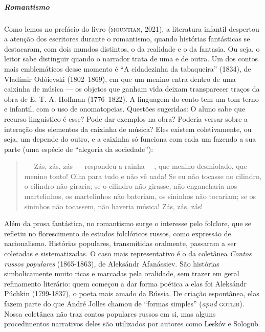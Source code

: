 \documentclass[11pt]{extarticle}
\begin{document}
\subparagraph{Romantismo}
Como lemos no prefácio do livro (\textsc{mountian}, 2021), a literatura
infantil despertou a atenção dos escritores durante o romantismo, quando
histórias fantásticas se destacaram, com dois mundos distintos, o da
realidade e o da fantasia. Ou seja, o leitor sabe distinguir quando o
narrador trata de uma e de outra. Um dos contos mais emblemáticos desse
momento é ``A cidadezinha da tabaqueira'' (1834), de Vladímir Odóievski
(1802--1869), em que um menino entra dentro de uma caixinha de música
--- os objetos que ganham vida deixam transparecer traços da obra de E.
T. A. Hoffman (1776--1822). A linguagem do conto tem um tom terno e
infantil, com o uso de onomatopeias. Questões sugeridas: O aluno sabe
que recurso linguístico é esse? Pode dar exemplos na obra? Poderia
versar sobre a interação dos elementos da caixinha de música? Eles
existem coletivamente, ou seja, um depende do outro, e a caixinha só
funciona com cada um fazendo a sua parte (uma espécie de ``alegoria da
sociedade''):

\begin{quote}
--- Zás, zás, zás --- respondeu a rainha ---, que menino desmiolado, que
menino tonto! Olha para tudo e não vê nada! Se eu não tocasse no
cilindro, o cilindro não giraria; se o cilindro não girasse, não
engancharia nos martelinhos, os martelinhos não bateriam, os sininhos
não tocariam; se os sininhos não tocassem, não haveria música! Zás, zás,
zás!

\end{quote}


Além da prosa fantástica, no romantismo surge o interesse pelo
folclore, que se refletiu no florescimento de estudos folclóricos
russos, como expressão de nacionalismo. Histórias populares,
transmitidas oralmente, passaram a ser coletadas e sistematizadas. O caso
mais representativo é o da coletânea \emph{Contos russos populares}
(1865-1863)\emph{,} de Aleksándr Afanássiev. São histórias
simbolicamente muito ricas e marcadas pela oralidade, sem trazer em
geral refinamento literário: quem começou a dar forma poética a elas foi
Aleksándr Púchkin (1799-1837), o poeta mais amado da Rússia. De criação
espontânea, elas fazem parte do que André Jolles chamou de ``formas
simples'' (\emph{apud} \textsc{gotlib}). Nossa coletânea não traz contos
populares russos em si, mas alguns procedimentos narrativos deles são
utilizados por autores como Leskóv e Sologub. 
\end{document}
